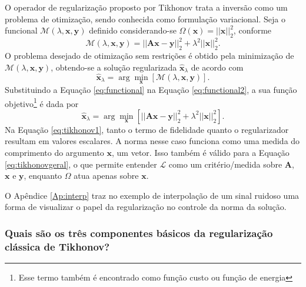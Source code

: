 O operador de regularização proposto por Tikhonov trata a inversão como um problema de otimização, sendo conhecida como formulação variacional. Seja o funcional $\mathcal{M}(\lambda, \mathbf{x}, \mathbf{y})$ definido considerando-se $\Omega(\mathbf{x}) = \vert \vert \mathbf{x} \vert \vert_2^2$, conforme
\begin{equation}
\mathcal{M}(\lambda, \mathbf{x}, \mathbf{y}) = \vert \vert \mathbf{A} \mathbf{x} - \mathbf{y} \vert \vert^2_2 + \lambda^2 \vert \vert \mathbf{x} \vert \vert_2^2.
\label{eq:functional}
\end{equation}
O problema desejado de otimização sem restrições é obtido pela minimização de $\mathcal{M}(\lambda, \mathbf{x}, \mathbf{y})$, obtendo-se  a solução regularizada $\hat{\mathbf{x}}_\lambda$ de acordo com
\begin{equation}
\hat{\mathbf{x}}_{\lambda} = \arg\min\limits_{\mathbf{x}} \left[\mathcal{M}(\lambda, \mathbf{x}, \mathbf{y}) \right].
\label{eq:functional2}
\end{equation}
Substituindo a Equação \eqref{eq:functional} na Equação \eqref{eq:functional2}, a sua função objetivo\footnote{Esse termo também é encontrado como  função custo ou função de energia} é dada por  
\begin{equation}
\hat{\mathbf{x}}_{\lambda} = \arg\min\limits_{\mathbf{x}} \left[ \vert \vert \mathbf{A} \mathbf{x} - \mathbf{y} \vert \vert^2_2 + \lambda^2 \vert \vert  \mathbf{x} \vert \vert_2^2 \right].
\label{eq:tikhonov1}
\end{equation}
Na Equação \eqref{eq:tikhonov1}, tanto o termo de fidelidade quanto o regularizador resultam em valores escalares. A norma nesse caso funciona como uma medida do comprimento do argumento $\mathbf{x}$, um vetor.  Isso também é válido para a Equação \eqref{eq:tikhonovgeral}, o que permite entender $\mathcal{L}$ como um critério/medida sobre $\mathbf{A}$, $\mathbf{x}$ e $\mathbf{y}$, enquanto $\Omega$ atua apenas sobre  $\mathbf{x}$. 

O Apêndice \ref{Ap:interp} traz no exemplo de interpolação de um sinal ruidoso uma forma de visualizar o papel da regularização no controle da norma da solução. 

\subsubsection{Quais são os três componentes básicos da regularização clássica de Tikhonov?}
   
